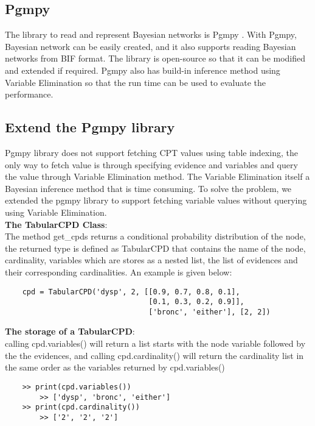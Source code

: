 
\subsection{Pgmpy}
The library to read and represent Bayesian networks is Pgmpy \cite{pgmpy_paper}. With Pgmpy, Bayesian network can be easily created, and it also supports reading Bayesian networks from BIF format. The library is open-source so that it can be modified and extended if required. Pgmpy also has build-in inference method using Variable Elimination so that the run time can be used to evaluate the performance. 

 \subsection{Extend the Pgmpy library}
    Pgmpy library does not support fetching CPT values using table indexing, the only way to fetch value is through specifying evidence and variables and query the value through Variable Elimination method. The Variable Elimination itself a Bayesian inference method that is time consuming. To solve the problem, we extended the pgmpy library to support fetching variable values without querying using Variable Elimination.\\

    \noindent \textbf{The TabularCPD Class}:\\
    The method get\_cpds returns a conditional probability distribution of the node, the returned type is defined as TabularCPD that contains the name of the node, cardinality, variables which are stores as a nested list, the list of evidences and their corresponding cardinalities. An example is given below:
    \begin{lstlisting}
    cpd = TabularCPD('dysp', 2, [[0.9, 0.7, 0.8, 0.1],
                                 [0.1, 0.3, 0.2, 0.9]],
                                 ['bronc', 'either'], [2, 2])
    \end{lstlisting}

    \noindent \textbf{The storage of a TabularCPD}:\\
    calling cpd.variables() will return a list starts with the node variable followed by the the evidences, and calling cpd.cardinality() will return the cardinality list in the same order as the variables returned by cpd.variables()
    \begin{lstlisting}
    >> print(cpd.variables())
        >> ['dysp', 'bronc', 'either']
    >> print(cpd.cardinality())
        >> ['2', '2', '2']
    \end{lstlisting}

